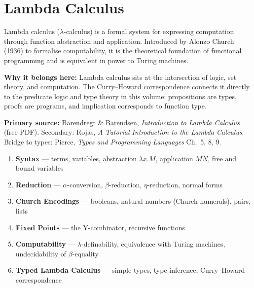 \chapter{Lambda Calculus}


\vspace{0.5em}

\begin{tcolorbox}[
  colback=blue!4,
  colframe=blue!30,
  arc=2pt,
  left=8pt, right=8pt, top=6pt, bottom=6pt,
  title={\small\textbf{Chapter Overview}},
  fonttitle=\small\bfseries
]
\small
Lambda calculus ($\lambda$-calculus) is a formal system for expressing
computation through function abstraction and application.
Introduced by Alonzo Church (1936) to formalise computability,
it is the theoretical foundation of functional programming
and is equivalent in power to Turing machines.

\medskip
\textbf{Why it belongs here:} Lambda calculus sits at the intersection
of logic, set theory, and computation.
The Curry--Howard correspondence connects it directly to the
predicate logic and type theory in this volume:
propositions are types, proofs are programs, and
implication corresponds to function type.

\medskip
\textbf{Primary source:} Barendregt \& Barendsen,
\textit{Introduction to Lambda Calculus} (free PDF).
Secondary: Rojas, \textit{A Tutorial Introduction to the Lambda Calculus}.
Bridge to types: Pierce, \textit{Types and Programming Languages} Ch.\ 5, 8, 9.
\end{tcolorbox}

\vspace{0.5em}

\begin{tcolorbox}[
  colback=amber!6,
  colframe=amber!40,
  arc=2pt,
  left=8pt, right=8pt, top=6pt, bottom=6pt,
  title={\small\textbf{Planned Content}},
  fonttitle=\small\bfseries
]
\small
\begin{enumerate}
  \item \textbf{Syntax} --- terms, variables, abstraction $\lambda x.M$,
        application $MN$, free and bound variables
  \item \textbf{Reduction} --- $\alpha$-conversion, $\beta$-reduction,
        $\eta$-reduction, normal forms
  \item \textbf{Church Encodings} --- booleans, natural numbers (Church numerals),
        pairs, lists
  \item \textbf{Fixed Points} --- the Y-combinator, recursive functions
  \item \textbf{Computability} --- $\lambda$-definability, equivalence with
        Turing machines, undecidability of $\beta$-equality
  \item \textbf{Typed Lambda Calculus} --- simple types, type inference,
        Curry--Howard correspondence
\end{enumerate}
\end{tcolorbox}

